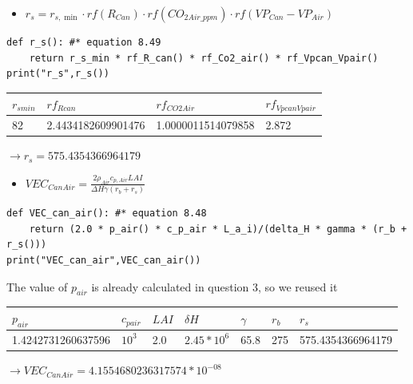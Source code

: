 \documentclass[a4paper]{article}
\numberwithin{equation}{section}
\begin{document}
\begin{itemize}
    \item $ r_s = r_{s,\min} \cdot rf(R_{Can}) \cdot rf(CO_{2Air\_ppm}) \cdot rf(VP_{Can} - VP_{Air})$
\end{itemize}
\begin{mdframed}[leftline=false,rightline=false,backgroundcolor=cyan!10]
  \begin{verbatim}
def r_s(): #* equation 8.49
    return r_s_min * rf_R_can() * rf_Co2_air() * rf_Vpcan_Vpair()
print("r_s",r_s())
\end{verbatim}
\end{mdframed}
\begin{table}[H]
\centering
\begin{tabular}{|l|l|l|l|}
\hline 
\rowcolor[HTML]{FFFC9E} 
\textbf{$r_{smin}$} & \textbf{$rf_{Rcan}$} & \cellcolor[HTML]{FFFC9E}\textbf{$rf_{CO2Air}$} & \cellcolor[HTML]{FFFC9E}\textbf{$rf_{VpcanVpair}$}\\ \hline
82            &  2.4434182609901476               & 1.0000011514079858            &  2.872                      \\ \hline
\end{tabular}
\end{table}
$\rightarrow r_{s} = 575.4354366964179$

\begin{itemize}
    \item $ VEC_{CanAir} = \frac{2 \rho_{Air} c_{p,Air}LAI}{\Delta H \gamma (r_b + r_s)}$
\end{itemize}
\begin{mdframed}[leftline=false,rightline=false,backgroundcolor=cyan!10]
  \begin{verbatim}
def VEC_can_air(): #* equation 8.48
    return (2.0 * p_air() * c_p_air * L_a_i)/(delta_H * gamma * (r_b + r_s()))
print("VEC_can_air",VEC_can_air())
\end{verbatim}
\end{mdframed}

The value of $p_{air}$ is already calculated in question 3, so we reused it

\begin{table}[H]
\centering
\begin{tabular}{|l|l|l|l|l|l|l|}
\hline
\rowcolor[HTML]{FFFC9E} 
\textbf{$p_{air}$} & \textbf{$c_{pair}$} & \cellcolor[HTML]{FFFC9E}\textbf{$LAI$} & \cellcolor[HTML]{FFFC9E}\textbf{$\delta H$}& \cellcolor[HTML]{FFFC9E}\textbf{$\gamma$}& \cellcolor[HTML]{FFFC9E}\textbf{$r_b$}& \cellcolor[HTML]{FFFC9E}\textbf{$r_s$}\\ \hline
1.4242731260637596            &$10^{3}$                & 2.0            & $2.45*10^{6}$     &65.8  &275  &  575.4354366964179               \\ \hline
\end{tabular}
\end{table}
$\rightarrow VEC_{CanAir} = 4.1554680236317574*10^{-08}$
\end{document}
